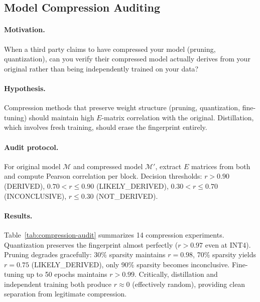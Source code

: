 \documentclass[wcp]{jmlr}
\begin{document}
\subsection{Model Compression Auditing}\label{sec:app-compression}

\paragraph{Motivation.} When a third party claims to have compressed your model (pruning, quantization), can you verify their compressed model actually derives from your original rather than being independently trained on your data?

\paragraph{Hypothesis.} Compression methods that preserve weight structure (pruning, quantization, fine-tuning) should maintain high $E$-matrix correlation with the original. Distillation, which involves fresh training, should erase the fingerprint entirely.

\paragraph{Audit protocol.} For original model $\mathcal{M}$ and compressed model $\mathcal{M}'$, extract $E$ matrices from both and compute Pearson correlation per block. Decision thresholds: $r > 0.90$ (DERIVED), $0.70 < r \leq 0.90$ (LIKELY\_DERIVED), $0.30 < r \leq 0.70$ (INCONCLUSIVE), $r \leq 0.30$ (NOT\_DERIVED).

\paragraph{Results.} Table~\ref{tab:compression-audit} summarizes 14 compression experiments. Quantization preserves the fingerprint almost perfectly ($r > 0.97$ even at INT4). Pruning degrades gracefully: 30\% sparsity maintains $r = 0.98$, 70\% sparsity yields $r = 0.75$ (LIKELY\_DERIVED), only 90\% sparsity becomes inconclusive. Fine-tuning up to 50 epochs maintains $r > 0.99$. Critically, distillation and independent training both produce $r \approx 0$ (effectively random), providing clean separation from legitimate compression.
\end{document}

